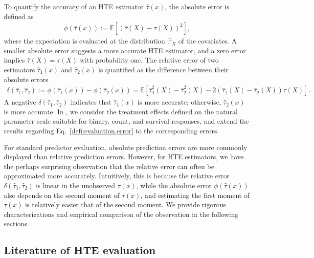 \documentclass{article}
\theoremstyle{plain}
\theoremstyle{definition}
\def\EE{\mathbb{E}}
\def\PP{\mathbb{P}}
\theoremstyle{plain}
\begin{document}
To quantify the accuracy of an HTE estimator $\hat{\tau}(x)$, the absolute error is defined as
\begin{align}\label{defi:evaluation.error}
    \phi(\hat{\tau}(x))
    := \EE\left[(\hat{\tau}(X) - \tau(X))^2\right],
\end{align}
where the expectation is evaluated at the distribution $\PP_X$ of the covariates. 
A smaller absolute error suggests a more accurate HTE estimator, and a zero error implies $\hat{\tau}(X) = {\tau}(X)$ with probability one.
The relative error of two estimators $\hat{\tau}_1(x)$ and $\hat{\tau}_2(x)$ is quantified as the difference between their absolute errors 
\begin{align}\label{defi:evaluation.error.relative}
    \delta(\hat{\tau}_1, \hat{\tau}_2)
    := \phi(\hat{\tau}_1(x)) - \phi(\hat{\tau}_2(x))  
    = \EE\left[\hat{\tau}_1^2(X) - \hat{\tau}_2^2(X) - 2(\hat{\tau}_1(X) - \hat{\tau}_2(X)) \tau(X) \right].
\end{align}  
A negative $\delta(\hat{\tau}_1, \hat{\tau}_2)$ indicates that $\hat{\tau}_1(x)$ is more accurate; otherwise, $\hat{\tau}_2(x)$ is more accurate.
In , we consider the treatment effects defined on the natural parameter scale suitable for binary, count, and survival responses, and extend the results regarding Eq.~\eqref{defi:evaluation.error} to the corresponding errors.


For standard predictor evaluation, absolute prediction errors are more commonly displayed than relative prediction errors.
However, for HTE estimators, we have the perhaps surprising observation that the relative error can often be approximated more accurately.
Intuitively, this is because the relative error $ \delta(\hat{\tau}_1, \hat{\tau}_2)$ is linear in the unobserved $\tau(x)$, while the absolute error $\phi(\hat{\tau}(x))$ also depends on the second moment of $\tau(x)$, and estimating the first moment of $\tau(x)$ is relatively easier that of the second moment. 
We provide rigorous characterizations and empirical comparison of the observation in the following sections.



\subsection{Literature of HTE evaluation}\label{sec:literature}
\end{document}
